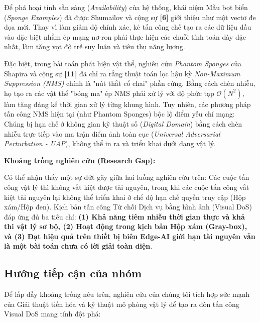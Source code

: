 \documentclass[a4paper,fleqn]{cas-dc}
\begin{document}
Để phá hoại tính sẵn sàng (\emph{Availability}) của hệ thống, khái niệm
Mẫu bọt biển (\emph{Sponge Examples}) đã được Shumailov và cộng sự
\textbf{{[}6{]}} giới thiệu như một vectơ đe dọa mới. Thay vì làm giảm
độ chính xác, kẻ tấn công chế tạo ra các dữ liệu đầu vào đặc biệt nhằm
ép mạng nơ-ron phải thực hiện các chuỗi tính toán dày đặc nhất, làm tăng
vọt độ trễ suy luận và tiêu thụ năng lượng.

Đặc biệt, trong bài toán phát hiện vật thể, nghiên cứu \emph{Phantom
Sponges} của Shapira và cộng sự \textbf{{[}11{]}} đã chỉ ra rằng thuật
toán lọc hậu kỳ \emph{Non-Maximum Suppression (NMS)} chính là "nút thắt
cổ chai" phần cứng. Bằng cách chèn nhiễu, họ tạo ra các vật thể "bóng
ma" ép NMS phải xử lý với độ phức tạp
\(\mathcal{O}\left( N^{2} \right)\), làm tăng đáng kể thời gian xử lý
từng khung hình. Tuy nhiên, các phương pháp tấn công NMS hiện tại (như
Phantom Sponges) bộc lộ điểm yếu chí mạng: Chúng bị hạn chế ở không gian
kỹ thuật số (\emph{Digital Domain}) bằng cách chèn nhiễu trực tiếp vào
ma trận điểm ảnh toàn cục (\emph{Universal Adversarial Perturbation -
UAP}), không thể in ra và triển khai dưới dạng vật lý.

\textbf{Khoảng trống nghiên cứu (Research Gap):}

Có thể nhận thấy một sự đứt gãy giữa hai luồng nghiên cứu trên: Các cuộc
tấn công vật lý thì không vắt kiệt được tài nguyên, trong khi các cuộc
tấn công vắt kiệt tài nguyên lại không thể triển khai ở chế độ hạn chế
quyền truy cập (Hộp xám/Hộp đen). Kịch bản tấn công Từ chối Dịch vụ bằng
hình ảnh (Visual DoS) đáp ứng đủ ba tiêu chí: \textbf{(1) Khả năng tiêm
nhiễu thời gian thực và khả thi vật lý sơ bộ, (2) Hoạt động trong kịch
bản Hộp xám (Gray-box), và (3) Đạt hiệu quả trên thiết bị biên Edge-AI
giới hạn tài nguyên vẫn là một bài toán chưa có lời giải toàn diện}.

\subsection{Hướng tiếp cận của nhóm}



Để lấp đầy khoảng trống nêu trên, nghiên cứu của chúng tôi tích hợp sức
mạnh của Giải thuật tiến hóa và kỹ thuật mô phỏng vật lý để tạo ra đòn
tấn công Visual DoS mang tính đột phá:
\end{document}
